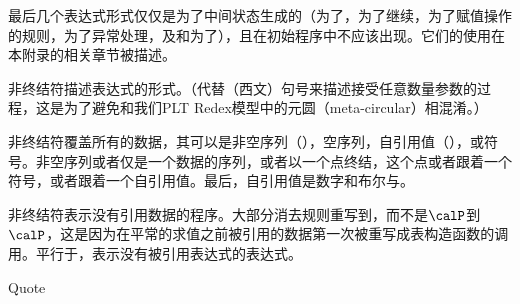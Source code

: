 最后几个表达式形式仅仅是为了中间状态生成的（为了，为了继续，为了赋值操作的规则，为了异常处理，及和为了），且在初始程序中不应该出现。它们的使用在本附录的相关章节被描述。

非终结符描述表达式的形式。（代替（西文）句号来描述接受任意数量参数的过程，这是为了避免和我们PLT Redex模型中的元圆（meta-circular）相混淆。）

非终结符覆盖所有的数据，其可以是非空序列（），空序列，自引用值（），或符号。非空序列或者仅是一个数据的序列，或者以一个点终结，这个点或者跟着一个符号，或者跟着一个自引用值。最后，自引用值是数字和布尔\semtrue{}与\semfalse{}。

非终结符表示没有引用数据的程序。大部分消去规则重写到，而不是$\calP$到$\calP$，这是因为在平常的求值之前被引用的数据第一次被重写成表构造函数的调用。平行于，表示没有被引用表达式的表达式。

\beginfig
\begin{center}



\end{center}
\caption{Quote}\label{fig:quote}
\endfig

